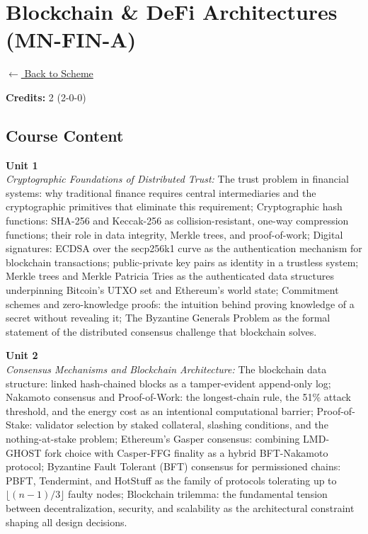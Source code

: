\section*{Blockchain \& DeFi Architectures (MN-FIN-A)}
\label{minor:FIN_L2}

\noindent \small{\hyperref[main:scheme]{$\leftarrow$ Back to Scheme}} \vspace{0.5cm}

\noindent \textbf{Credits:} 2 (2-0-0)

\subsection*{Course Content}
\noindent\textbf{Unit 1} \\
\textit{Cryptographic Foundations of Distributed Trust:} The trust problem in financial systems: why traditional finance requires central intermediaries and the cryptographic primitives that eliminate this requirement; Cryptographic hash functions: SHA-256 and Keccak-256 as collision-resistant, one-way compression functions; their role in data integrity, Merkle trees, and proof-of-work; Digital signatures: ECDSA over the secp256k1 curve as the authentication mechanism for blockchain transactions; public-private key pairs as identity in a trustless system; Merkle trees and Merkle Patricia Tries as the authenticated data structures underpinning Bitcoin's UTXO set and Ethereum's world state; Commitment schemes and zero-knowledge proofs: the intuition behind proving knowledge of a secret without revealing it; The Byzantine Generals Problem as the formal statement of the distributed consensus challenge that blockchain solves.

\vspace{0.3cm}

\noindent\textbf{Unit 2} \\
\textit{Consensus Mechanisms and Blockchain Architecture:} The blockchain data structure: linked hash-chained blocks as a tamper-evident append-only log; Nakamoto consensus and Proof-of-Work: the longest-chain rule, the 51\% attack threshold, and the energy cost as an intentional computational barrier; Proof-of-Stake: validator selection by staked collateral, slashing conditions, and the nothing-at-stake problem; Ethereum's Gasper consensus: combining LMD-GHOST fork choice with Casper-FFG finality as a hybrid BFT-Nakamoto protocol; Byzantine Fault Tolerant (BFT) consensus for permissioned chains: PBFT, Tendermint, and HotStuff as the family of protocols tolerating up to $\lfloor (n-1)/3 \rfloor$ faulty nodes; Blockchain trilemma: the fundamental tension between decentralization, security, and scalability as the architectural constraint shaping all design decisions.


